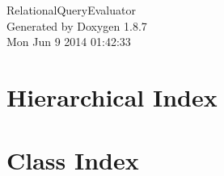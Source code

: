 \documentclass[twoside]{book}
\newcommand{\+}{\discretionary{\mbox{\scriptsize$\hookleftarrow$}}{}{}}
\newcommand{\clearemptydoublepage}{%
  \newpage{\pagestyle{empty}\cleardoublepage}%
}
\begin{document}
\hypersetup{pageanchor=false,
             bookmarks=true,
             bookmarksnumbered=true,
             pdfencoding=unicode
            }
\begin{titlepage}
\vspace*{7cm}
\begin{center}%
{\Large Relational\+Query\+Evaluator }\\
\vspace*{1cm}
{\large Generated by Doxygen 1.8.7}\\
\vspace*{0.5cm}
{\small Mon Jun 9 2014 01:42:33}\\
\end{center}
\end{titlepage}
\clearemptydoublepage
\tableofcontents
\clearemptydoublepage
{}
\hypersetup{pageanchor=true}

\chapter{Hierarchical Index}

\chapter{Class Index}

\end{document}
